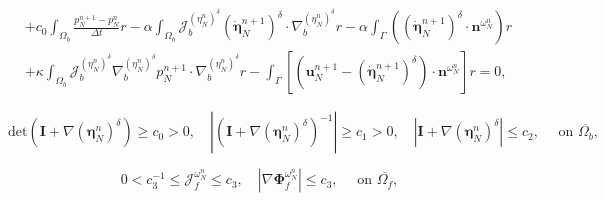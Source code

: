 \documentclass[10pt,a4paper]{amsart}
\newcommand{\bd}{\boldsymbol}
\begin{document}
\begin{equation}
\begin{aligned}
\\
&+ c_{0}  \int_{\Omega_{b}} \frac{p^{n + 1}_{N} - p^{n}_{N}}{\Delta t} r - \alpha \int_{\Omega_{b}} \mathcal{J}^{(\eta^{n}_{N})^{\delta}}_{b} \left(\boldsymbol{\dot{\eta}}^{n + 1}_{N}\right)^{\delta} \cdot \nabla^{(\eta^{n}_{N})^{\delta}}_{b} r - \alpha \int_{\Gamma} \left(\left(\boldsymbol{\dot{\eta}}^{n + 1}_{N}\right)^{\delta} \cdot \boldsymbol{n}^{\omega^{n}_{N}}\right) r 
\\
&+ \kappa \int_{\Omega_{b}} \mathcal{J}^{(\eta^{n}_{N})^{\delta}}_{b} \nabla^{(\eta^{n}_{N})^{\delta}}_{b} p^{n + 1}_{N} \cdot \nabla^{(\eta^{n}_{N})^{\delta}}_{b} r - \int_{\Gamma} \left[\left(\boldsymbol{u}^{n + 1}_{N} - \left(\boldsymbol{\dot{\eta}}^{n + 1}_{N}\right)^{\delta}\right) \cdot \boldsymbol{n}^{\omega^{n}_{N}}\right]r = 0,
\end{aligned}
\end{equation}

\begin{equation}\label{uniformgeom1}
\text{det}(\bd{I} + \nabla (\bd{\eta}^{n}_{N})^{\delta}) \ge c_{0} > 0, \quad |(\bd{I} + \nabla(\bd{\eta}^{n}_{N})^{\delta})^{-1}| \ge c_{1} > 0, \quad |\bd{I} + \nabla (\bd{\eta}^{n}_{N})^{\delta}| \le c_{2}, \quad \text{ on } \overline{\Omega_{b}},
\end{equation}

\begin{equation}\label{uniformgeom2}
0 < c_{3}^{-1} \le \mathcal{J}^{\omega^{n}_{N}}_{f} \le c_{3}, \quad |\nabla \bd{\Phi}^{\omega^{n}_{N}}_{f}| \le c_{3}, \quad \text{ on } \overline{\Omega_{f}},
\end{equation}
\end{document}
